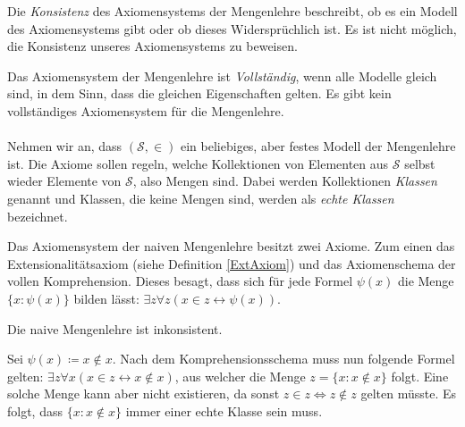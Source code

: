 Die \textit{Konsistenz} des Axiomensystems der Mengenlehre beschreibt, ob es ein Modell des Axiomensystems gibt oder ob dieses Widersprüchlich ist. Es ist nicht möglich, die Konsistenz unseres Axiomensystems zu beweisen.

Das Axiomensystem der Mengenlehre ist \textit{Vollständig}, wenn alle Modelle \glqq gleich \grqq{} sind, in dem Sinn, dass die gleichen Eigenschaften gelten. Es gibt kein vollständiges Axiomensystem für die Mengenlehre.
\\
\\
Nehmen wir an, dass $(\mathcal{S},\in)$ ein beliebiges, aber festes Modell der Mengenlehre ist. Die Axiome sollen regeln, welche Kollektionen von Elementen aus $\mathcal{S}$ selbst wieder Elemente von $\mathcal{S}$, also Mengen sind. Dabei werden Kollektionen \textit{Klassen} genannt und Klassen, die keine Mengen sind, werden als \textit{echte Klassen} bezeichnet.

\begin{definition}
	Das Axiomensystem der naiven Mengenlehre besitzt zwei Axiome. Zum einen das Extensionalitätsaxiom (siehe Definition \ref{ExtAxiom}) und das Axiomenschema der vollen Komprehension. Dieses besagt, dass sich für jede Formel $\psi(x)$ die Menge $\{x : \psi(x)\}$ bilden lässt: $\exists z \forall z(x \in z \leftrightarrow \psi(x))$.
\end{definition}

\begin{satz}
	Die naive Mengenlehre ist inkonsistent.
	
	Sei $\psi(x)\coloneqq x\notin x$. Nach dem Komprehensionsschema muss nun folgende Formel gelten: $\exists z \forall x(x\in z \leftrightarrow x\notin x)$, aus welcher die Menge $z=\{x : x\notin x\}$ folgt. Eine solche Menge kann aber nicht existieren, da sonst $z\in z \Leftrightarrow z \notin z$ gelten müsste. Es folgt, dass $\{x:x\notin x\}$ immer einer echte Klasse sein muss.
\end{satz}

